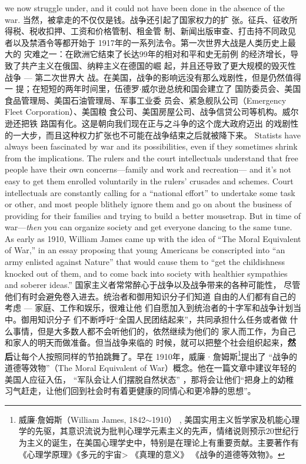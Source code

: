 \begin{paracol}{2}
we now struggle under, and it could not have been done in the
absence of the war.
\switchcolumn
当然，被拿走的不仅仅是钱。战争还引起了国家权力的扩
张。征兵、征收所得税、税收扣押、工资和价格管制、租金管
制、新闻出版审查、打击持不同政见者以及禁酒令等都开始于
1917年的一系列法令。第一次世界大战是人类历史上最大的
灾难之一：在欧洲它结束了长达99年的相对和平和史无前例
的经济增长，导致了共产主义在俄国、纳粹主义在德国的崛
起，并且还导致了更大规模的毁灭性战争 --- 第二次世界大
战。在美国，战争的影响远没有那么戏剧性，但是仍然值得一
提；在短短的两年时间里，伍德罗$\cdot$威尔逊总统和国会建立了
国防委员会、美国食品管理局、美国石油管理局、军事工业委
员会、紧急舰队公司（Emergency Fleet Corporation）、美国粮
食公司、美国房屋公司、战争信贷公司等机构。威尔逊还把铁
路国有化。这是朝向我们现在正与之斗争的这个庞大政府迈出
的戏剧性的一大步，而且这种权力扩张也不可能在战争结束之后就被降下来。
\switchcolumn*
Statists have always been fascinated by war and its possibilities, even if they sometimes shrink from the implications. The
rulers and the court intellectuals understand that free people
have their own concerns---family and work and recreation---
and it's not easy to get them enrolled voluntarily in the rulers'
crusades and schemes. Court intellectuals are constantly calling
for a ``national effort'' to undertake some task or other, and
most people blithely ignore them and go on about the business
of providing for their families and trying to build a better
mousetrap. But in time of war---\textit{then} you can organize society
and get everyone dancing to the same tune. As early as 1910,
William James came up with the idea of ``The Moral Equivalent
of War,'' in an essay proposing that young Americans be conscripted into ``an army enlisted against Nature'' that would
cause them to ``get the childishness knocked out of them, and
to come back into society with healthier sympathies and soberer
ideas.''
\switchcolumn
国家主义者常常醉心于战争以及战争带来的各种可能性，
尽管他们有时会避免卷入进去。统治者和御用知识分子们知道
自由的人们都有自己的考虑 --- 家庭、工作和娱乐，很难让他
们自愿加入到统治者的十字军和战争计划当中。御用知识分子
们不断呼吁“全国人民团结起来”，共同承担什么任务或者做
什么事情，但是大多数人都不会听他们的，依然继续为他们的
家人而工作，为自己和家人的明天而做准备。但当战争来临的
时候，就可以把整个社会组织起来，\textbf{然后}让每个人按照同样的节拍跳舞了。早在 1910年，威廉 $\cdot$ 詹姆斯\footnote{威廉$\cdot$詹姆斯（William  James, 1842$\sim$1910） , 美国实用主义哲学家及机能心理学的先驱，其意识流说为批判心理学元素主义的先声，情绪说则预示20世纪行为主义的诞生，在美国心理学史中，特别是在理论上有重要贡献。主要著作有 《心理学原理》《多元的宇宙> 《真理的意义》 《战争的道德等效物》。}提出了 “战争的道德等效物”（The  Moral Equivalent of War）概念。他在一篇文章中建议年轻的美国人应征入伍， “军队会让人们摆脱自然状态” ，那将会让他们“把身上的幼稚习气赶走，让他们回到社会时有着更健康的同情心和更冷静的思想”。

\end{paracol}
